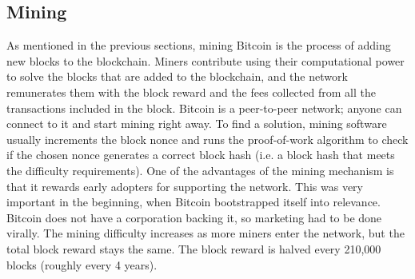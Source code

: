 \documentclass{article}
\begin{document}
\subsection*{Mining}
As mentioned in the previous sections, mining Bitcoin is the process of adding new blocks to the blockchain. Miners contribute using their computational power to solve the blocks that are added to the blockchain, and the network remunerates them with the block reward and the fees collected from all the transactions included in the block. Bitcoin is a peer-to-peer network; anyone can connect to it and start mining right away. To find a solution, mining software usually increments the block nonce and runs the proof-of-work algorithm to check if the chosen nonce generates a correct block hash (i.e. a block hash that meets the difficulty requirements). One of the advantages of the mining mechanism is that it rewards early adopters for supporting the network. This was very important in the beginning, when Bitcoin bootstrapped itself into relevance. Bitcoin does not have a corporation backing it, so marketing had to be done virally.\newline
The mining difficulty increases as more miners enter the network, but the total block reward stays the same. The block reward is halved every 210,000 blocks (roughly every 4 years).
\end{document}
